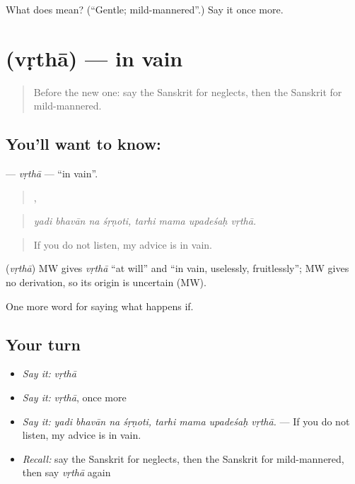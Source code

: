 \begin{tcolorbox}[breakable,colback=teal!4,colframe=teal!35!black,title={Before you move on}]
What does  mean? (\textquotedblleft{}Gentle; mild-mannered\textquotedblright{}.) Say it once more.
\end{tcolorbox}
\section[\texorpdfstring{\sk{वृथा} (vṛthā)}{वृथा (vṛthā)}]{ (vṛthā) — in vain}

\label{lesson:SA-C388-vrtha}



\begin{quote}
Before the new one: say the Sanskrit for neglects, then the Sanskrit for mild-mannered.
\end{quote}

\subsection*{You'll want to know: }
\textbf{} — \emph{vṛthā} — \textquotedblleft{}in vain\textquotedblright{}.

\begin{quote}
   ,    
\end{quote}

\begin{quote}
\emph{yadi bhavān na śṛṇoti, tarhi mama upadeśaḥ vṛthā.}
\end{quote}

\begin{quote}
If you do not listen, my advice is in vain.
\end{quote}

\begin{cousinweb}
\textbf{} (\emph{vṛthā}) MW gives \emph{vṛthā} \textquotedblleft{}at will\textquotedblright{} and \textquotedblleft{}in vain, uselessly, fruitlessly\textquotedblright{}; MW gives no derivation, so its origin is uncertain (MW).
\end{cousinweb}

\begin{grammarlens}[title={What you've built}]
One more word for saying what happens if.
\end{grammarlens}

\subsection*{Your turn}
\begin{itemize}
\raggedright
  \item \emph{Say it:} \emph{vṛthā}
  \item \emph{Say it:} \emph{vṛthā}, once more
  \item \emph{Say it:} \emph{yadi bhavān na śṛṇoti, tarhi mama upadeśaḥ vṛthā.} — If you do not listen, my advice is in vain.
  \item \emph{Recall:} say the Sanskrit for neglects, then the Sanskrit for mild-mannered, then say \emph{vṛthā} again
\end{itemize}

